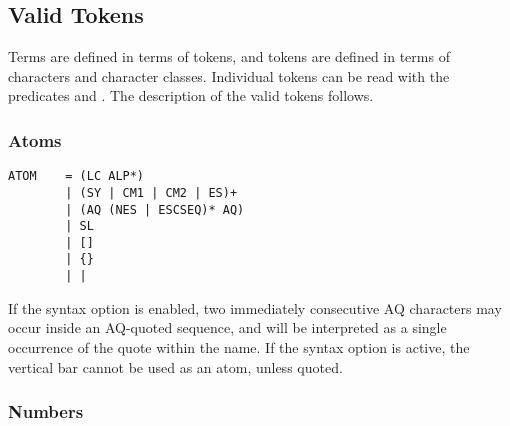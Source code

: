 \subsection{Valid Tokens}
\label{tokendef}

Terms are defined in terms of tokens, and tokens are defined in terms of
characters and character classes.
Individual tokens can be read with the predicates
 and
.
The description of the valid tokens follows.

\vfill %

\subsubsection{Atoms}

\begin{verbatim}
ATOM    = (LC ALP*)
        | (SY | CM1 | CM2 | ES)+
        | (AQ (NES | ESCSEQ)* AQ)
        | SL
        | []
        | {}
        | |
\end{verbatim}
If the syntax option  is enabled, two
immediately consecutive AQ characters may occur inside an AQ-quoted sequence,
and will be interpreted as a single occurrence of the quote within the name.
If the syntax option  is active, the vertical bar
cannot be used as an atom, unless quoted.

\subsubsection{Numbers}

